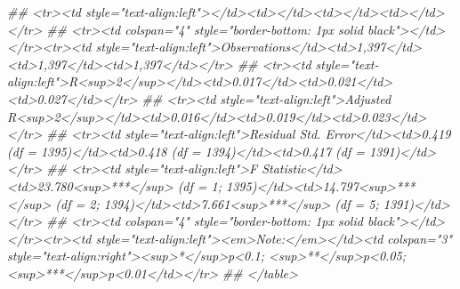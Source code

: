\documentclass[
]{article}
\newenvironment{Shaded}{\begin{snugshade}}{\end{snugshade}}
\newcommand{\CommentTok}[1]{\textcolor[rgb]{0.56,0.35,0.01}{\textit{#1}}}
\begin{document}
\begin{Shaded}
\begin{Highlighting}[]
{{\CommentTok{## <tr><td style="text-align:left"></td><td></td><td></td><td></td></tr>}
\CommentTok{## <tr><td colspan="4" style="border-bottom: 1px solid black"></td></tr><tr><td style="text-align:left">Observations</td><td>1,397</td><td>1,397</td><td>1,397</td></tr>}
\CommentTok{## <tr><td style="text-align:left">R<sup>2</sup></td><td>0.017</td><td>0.021</td><td>0.027</td></tr>}
\CommentTok{## <tr><td style="text-align:left">Adjusted R<sup>2</sup></td><td>0.016</td><td>0.019</td><td>0.023</td></tr>}
\CommentTok{## <tr><td style="text-align:left">Residual Std. Error</td><td>0.419 (df = 1395)</td><td>0.418 (df = 1394)</td><td>0.417 (df = 1391)</td></tr>}
\CommentTok{## <tr><td style="text-align:left">F Statistic</td><td>23.780<sup>***</sup> (df = 1; 1395)</td><td>14.797<sup>***</sup> (df = 2; 1394)</td><td>7.661<sup>***</sup> (df = 5; 1391)</td></tr>}
\CommentTok{## <tr><td colspan="4" style="border-bottom: 1px solid black"></td></tr><tr><td style="text-align:left"><em>Note:</em></td><td colspan="3" style="text-align:right"><sup>*</sup>p<0.1; <sup>**</sup>p<0.05; <sup>***</sup>p<0.01</td></tr>}
\CommentTok{## </table>}




}}
\end{Highlighting}
\end{Shaded}
\end{document}
